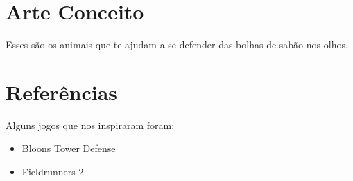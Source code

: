 \documentclass[a4paper,draft,12pt]{article}
\newcounter{tbsnr}
\newenvironment{tbs}
{\addtocounter{tbsnr}{1}\par\bigskip \noindent\fbox{\thetbsnr}
\hspace*{\fill}\begin{minipage}{10cm}\tt}
{\end{minipage}\hspace*{\fill}\bigskip}
\newcommand{\tb}[1]{\begin{tbs}{#1}\end{tbs}}
\newcounter{Def}
\begin{document}
\section{Arte Conceito}

\vspace{8cm}
Esses são os animais que te ajudam a se defender das bolhas de sabão nos olhos.
\section{Referências}
Alguns jogos que nos inspiraram foram:

\begin{itemize}
\vspace{8cm}
\item[] Bloons Tower Defense
\vspace{8cm}
\item[] Fieldrunners 2
\end{itemize}





\end{document}
